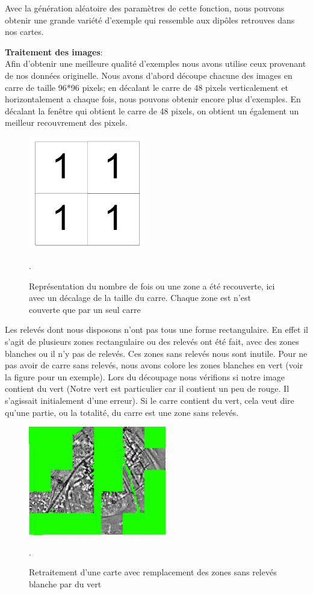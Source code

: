 \documentclass[a4paper, 12pt, titlepage, oneside, french]{article}
\begin{document}
	Avec la génération aléatoire des paramètres de cette fonction, nous pouvons obtenir une grande variété d'exemple qui ressemble aux dipôles retrouves dans nos cartes.

	\textbf{Traitement des images}:\\%
	\indent Afin d'obtenir une meilleure qualité d'exemples nous avons utilise ceux provenant de nos données originelle. Nous avons d'abord découpe chacune des images en carre de taille 96*96 pixels; en décalant le carre de 48 pixels verticalement et horizontalement a chaque fois, nous pouvons obtenir encore plus d'exemples. En décalant la fenêtre qui obtient le carre de 48 pixels, on obtient un également un meilleur recouvrement des pixels.

	
\begin{figure}[H]
		\centering
		\includegraphics[width=5cm]{ExempleCarre.png}
		\caption{Représentation du nombre de fois ou une zone a été recouverte, ici avec un décalage de la taille du carre. Chaque zone est n'est couverte que par un seul carre}. 
		\label{fig:ExempleCarre}
\end{figure}

Les relevés dont nous disposons n'ont pas tous une forme rectangulaire. En effet il s'agit de plusieurs zones rectangulaire ou des relevés ont été fait, avec des zones blanches ou il n'y pas de relevés. Ces zones sans relevés nous sont inutile. Pour ne pas avoir de carre sans relevés, nous avons colore les zones blanches en vert (voir la figure \cite{fig:ReleveColore} pour un exemple). Lors du découpage nous vérifions si notre image contient du vert (Notre vert est particulier car il contient un peu de rouge. Il s'agissait initialement d'une erreur). Si le carre contient du vert, cela veut dire qu'une partie, ou la totalité, du carre est une zone sans relevés.

\begin{figure}[H]
		\centering
		\includegraphics[width=6cm]{ExemplePretraitement.jpg}
		\caption{Retraitement d'une carte avec remplacement des zones sans relevés blanche par du vert}. 
		\label{fig:ReleveColore}
	\end{figure}
\end{document}
